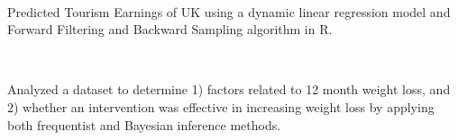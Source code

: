 \documentclass[]{deedy-resume-openfont}
\begin{document}
\begin{minipage}[t]{0.66\textwidth}
 \\
\begin{tightemize}
\item Predicted Tourism Earnings of UK using a dynamic linear
  regression model and Forward Filtering and Backward Sampling algorithm in
  R.
\end{tightemize}
\sectionsep

 \\
\begin{tightemize}
\item Analyzed a dataset to determine 1) factors related to 12 month weight
loss, and 2) whether an intervention was effective in increasing weight loss by
applying both frequentist and Bayesian inference methods.
\end{tightemize}
\sectionsep

\end{minipage}
\end{document}
